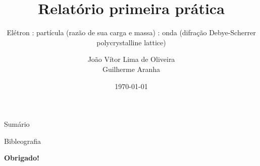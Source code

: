 \documentclass[aspectratio=169,12.5pt,xcolor=dvipsnames]{beamer}
\title{Relatório primeira prática}
\subtitle{Elétron : partícula (razão de sua carga e massa) : onda (difração Debye-Scherrer polycrystalline lattice)}
\author{João Vítor Lima de Oliveira
\\
Guilherme Aranha}
\institute
{
    Instituto de Física de São Carlos
    \\
    Universidade de São Paulo %
}
\date{\today} %
\begin{document}
\begin{frame}
    \titlepage
\end{frame}

\begin{frame}{Sumário}
    \tableofcontents
\end{frame}






\begin{frame}{Bibleografia}
    \footnotesize
    
    
\end{frame}


\begin{frame}
    \Huge{\centerline{\textbf{Obrigado!}}}
\end{frame}

\end{document}
